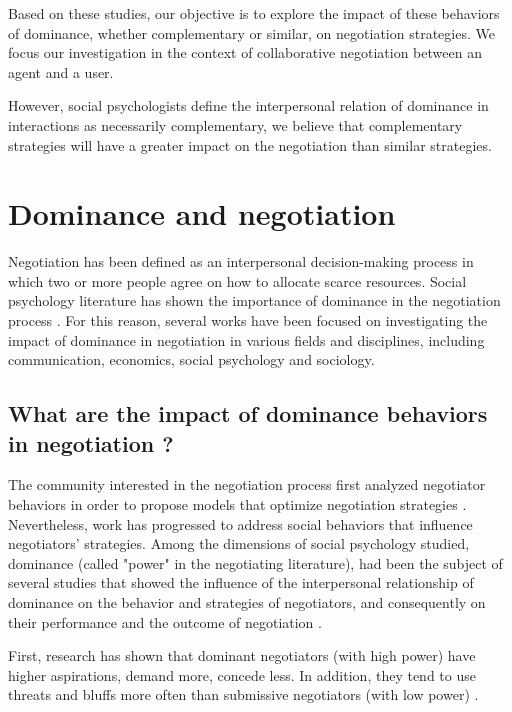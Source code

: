 \documentclass[10pt, a4paper, twocolumn]{article} %
\begin{document}
	Based on these studies, our objective is to explore the impact of these  behaviors of dominance, whether complementary or similar, on negotiation strategies. We focus our investigation in the context of collaborative negotiation between an agent and a user. 
	 
	However, social psychologists define the interpersonal relation of dominance in interactions as necessarily complementary, we believe that complementary strategies will have a greater impact on the negotiation than similar strategies.
 
\section{Dominance and negotiation}	
	
	Negotiation has been defined as an interpersonal decision-making process in which two or more people agree on how to allocate scarce resources\cite {thompson2000mind}.  Social psychology literature has shown the importance of dominance in the negotiation process \cite{de1995impact,van2006power,fiske1993controlling}. For this reason, several works have been focused on investigating the impact of dominance in negotiation in various fields and disciplines, including communication, economics, social psychology and sociology.
	
	\subsection{What are the impact of dominance behaviors in negotiation ?}
	
			The community interested in the negotiation process first analyzed negotiator behaviors in order to propose models that optimize negotiation strategies \cite{thompson2010negotiation}.
			Nevertheless, work has progressed to address  social behaviors that influence negotiators' strategies. 
			Among the dimensions of social psychology studied, dominance (called "power" in the negotiating literature), had been the subject of several studies that showed the influence of the interpersonal relationship of dominance on the behavior and strategies of negotiators, and consequently on their performance and the outcome of negotiation \cite{de1995impact,van2006power}.
			
			First, research has shown that dominant negotiators (with high power) have higher aspirations, demand more, concede less. In addition, they tend to use threats and bluffs more often than submissive negotiators (with low power) \cite{de1995impact}.
			
\end{document}
